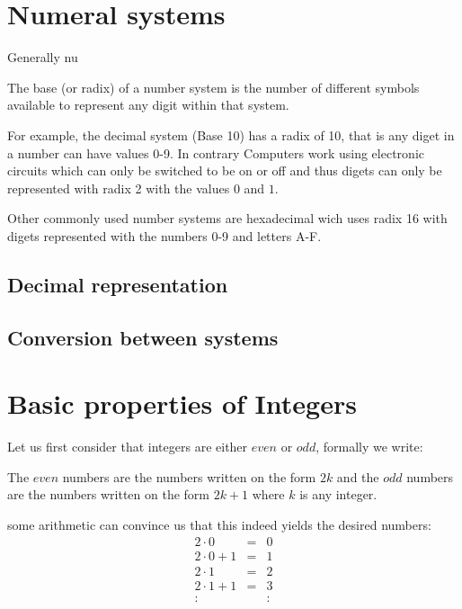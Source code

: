 \section{Numeral systems}
Generally nu

The base (or radix) of a number system is the number of different symbols 
available to represent any digit within that system.

For example, the decimal system (Base 10) has a radix of 10, that is any 
diget in a number can have values 0-9. In contrary Computers work using 
electronic circuits which can only be switched to be on or off and thus 
digets can only be represented with radix 2 with the values $0$ and $1$.

Other commonly used number systems are hexadecimal wich uses radix 16 
with digets represented with the numbers 0-9 and letters A-F.


\subsection{Decimal representation}

\subsection{Conversion between systems}

\section{Basic properties of Integers}
Let us first consider that integers are either $even$ or $odd$, formally we
write:
\begin{definition}\label{num_def}
The $even$ numbers are the numbers written on the form $2k$ and the $odd$
numbers are the numbers written on the form $2k+1$ where $k$ is any
integer.
\end{definition}
some arithmetic can convince us that this indeed yields the desired numbers:
\[
\begin{array}{lcl}
2 \cdot 0     & = & 0 \\
2 \cdot 0 + 1 & = & 1 \\
2 \cdot 1     & = & 2 \\
2 \cdot 1 + 1 & = & 3 \\
:             &   & :
\end{array}
\]

